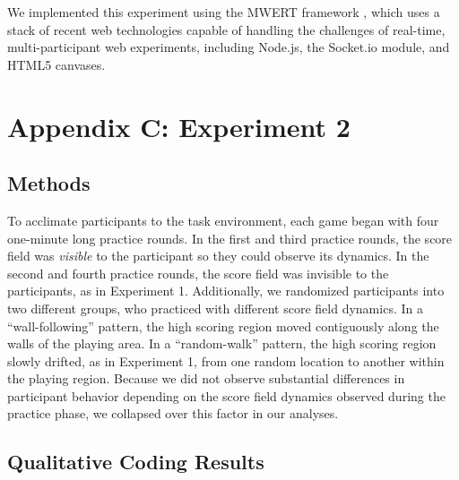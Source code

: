 \documentclass[12pt,letterpaper]{article}
\begin{document}
We implemented this experiment using the MWERT framework \cite{hawkins_conducting_2014}, which uses a stack of recent web technologies capable of handling the challenges of real-time, multi-participant web experiments, including Node.js, the Socket.io module, and HTML5 canvases.  

\section*{Appendix C: Experiment 2}

\subsection*{Methods}

To acclimate participants to the task environment, each game began with four one-minute long practice rounds. 
In the first and third practice rounds, the score field was \emph{visible} to the participant so they could observe its dynamics.
In the second and fourth practice rounds, the score field was invisible to the participants, as in Experiment 1. 
Additionally, we randomized participants into two different groups, who practiced with different score field dynamics. 
In a ``wall-following'' pattern, the high scoring region moved contiguously along the walls of the playing area. 
In a ``random-walk'' pattern, the high scoring region slowly drifted, as in Experiment 1, from one random location to another within the playing region.
Because we did not observe substantial differences in participant behavior depending on the score field dynamics observed during the practice phase, we collapsed over this factor in our analyses.

\subsection*{Qualitative Coding Results}
\end{document}
